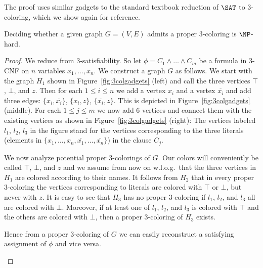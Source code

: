 The proof uses similar gadgets to the standard textbook reduction of $\SAT$ to $3$-coloring, which we show again for reference.
\begin{lemma}
    \label{lem:3colhardness}
    Deciding whether a given graph $G = (V, E)$ admits a proper $3$-coloring is $\NP$-hard.
\end{lemma}
\begin{proof}
    We reduce from $3$-satisfiability.
    So let $\phi = C_1 \land \ldots \land C_m$ be a formula in $3$-CNF on $n$ variables $x_1, \ldots, x_n$.
    We construct a graph $G$ as follows. We start with the graph $H_1$ shown in Figure~\ref{fig:3colgadgets} (left) and call the three vertices $\top$, $\bot$, and $z$.
    Then for each $1 \leq i \leq n$ we add a vertex $x_i$ and a vertex $\overline{x_i}$ and add three edges: $\{x_i,\overline{x_i}\}$, $\{x_i,z\}$, $\{\overline{x_i},z\}$. This is depicted in Figure~\ref{fig:3colgadgets} (middle).
    For each $1 \leq j \leq m$ we now add 6 vertices and connect them with the existing vertices as shown in Figure~\ref{fig:3colgadgets} (right): The vertices labeled $l_1$, $l_2$, $l_3$ in the figure stand for the vertices corresponding to the three literals (elements in $\{x_1,\ldots,x_n,\overline{x_1},\ldots,\overline{x_n}\}$) in the clause $C_j$.
    
    We now analyze potential proper 3-colorings of $G$. Our colors will conveniently be called $\top$, $\bot$, and $z$ and we assume from now on w.l.o.g.\ that the three vertices in $H_1$ are colored according to their names. It follows from $H_2$ that in every proper 3-coloring the vertices corresponding to literals are colored with $\top$ or $\bot$, but never with $z$.
    It is easy to see that $H_3$ has no proper 3-coloring if $l_1$, $l_2$, and $l_3$ all are colored with $\bot$.
    Moreover, if at least one of $l_1$, $l_2$, and $l_3$ is colored with $\top$ and the others are colored with $\bot$, then a proper 3-coloring of $H_3$ exists.
    
    Hence from a proper 3-coloring of $G$ we can easily reconstruct a satisfying assignment of $\phi$ and vice versa.
    \begin{figure}[tpb]
        \centering
        \hskip 20pt
\end{figure}
\end{proof}

